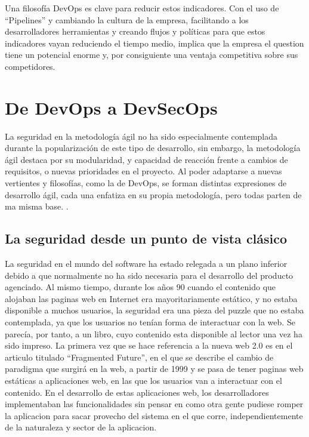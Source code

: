 \documentclass[12pt]{report} %
\begin{document}
Una filosofía DevOps es clave para reducir estos indicadores.  Con el uso de
``Pipelines'' y cambiando la cultura de la empresa, facilitando a los
desarrolladores herramientas y creando flujos y políticas para que estos
indicadores vayan reduciendo el tiempo medio, implica que la empresa el question
tiene un potencial enorme y, por consiguiente una ventaja competitiva sobre sus
competidores.

\section{De DevOps a DevSecOps}

La seguridad en la metodología ágil no ha sido especialmente contemplada durante
la popularización de este tipo de desarrollo, sin embargo, la metodología ágil
destaca por su modularidad, y capacidad de reacción frente a cambios de
requisitos, o nuevas prioridades en el proyecto.  Al poder adaptarse a nuevas
vertientes y filosofías, como la de DevOps, se forman distintas expresiones de
desarrollo ágil, cada una enfatiza en su propia metodología, pero todas parten
de ma misma base. \cite{agilePrinciples}.

\subsection{La seguridad desde un punto de vista clásico}
 
La seguridad en el mundo del software ha estado relegada a un plano inferior
debido a que normalmente no ha sido necesaria para el desarrollo del producto
agenciado.  Al mismo tiempo, durante los años 90 cuando el contenido que
alojaban las paginas web en Internet era mayoritariamente estático, y no estaba
disponible a muchos usuarios, la seguridad era una pieza del puzzle que no
estaba contemplada, ya que los usuarios no tenían forma de interactuar con la
web.  Se parecía, por tanto, a un libro, cuyo contenido esta disponible al
lector una vez ha sido impreso.  La primera vez que se hace referencia a la
nueva web 2.0 es en el articulo titulado ``Fragmented Future'', en el que se
describe el cambio de paradigma que surgirá en la web, a partir de 1999 y se
pasa de tener paginas web estáticas a aplicaciones web, en las que los usuarios
van a interactuar con el contenido. \cite{DiNucci1999} En el desarrollo de estas
aplicaciones web, los desarrolladores implementaban las funcionalidades sin
pensar en como otra gente pudiese romper la aplicacion para sacar provecho del
sistema en el que corre, independientemente de la naturaleza y sector de la
aplicacion.
\end{document}
